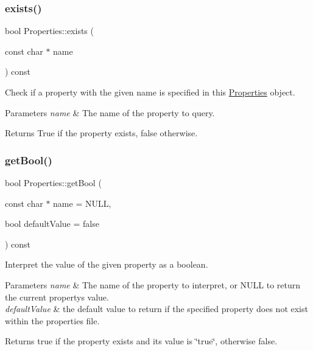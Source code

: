 \subsubsection{\texorpdfstring{exists()}{exists()}\hspace{0.1cm}{\footnotesize\ttfamily [2/2]}}
{\footnotesize\ttfamily bool Properties\+::exists (\begin{DoxyParamCaption}\item[{const char $\ast$}]{name }\end{DoxyParamCaption}) const}

Check if a property with the given name is specified in this \hyperlink{classProperties}{Properties} object.


\begin{DoxyParams}{Parameters}
{\em name} & The name of the property to query.\\
\hline
\end{DoxyParams}
\begin{DoxyReturn}{Returns}
True if the property exists, false otherwise. 
\end{DoxyReturn}
\mbox{\label{classProperties_a71277d94b2486dd4f6f8ca5bde7cfcc8}} 
\subsubsection{\texorpdfstring{get\+Bool()}{getBool()}\hspace{0.1cm}{\footnotesize\ttfamily [1/2]}}
{\footnotesize\ttfamily bool Properties\+::get\+Bool (\begin{DoxyParamCaption}\item[{const char $\ast$}]{name = {\ttfamily NULL},  }\item[{bool}]{default\+Value = {\ttfamily false} }\end{DoxyParamCaption}) const}

Interpret the value of the given property as a boolean.


\begin{DoxyParams}{Parameters}
{\em name} & The name of the property to interpret, or N\+U\+LL to return the current property\textquotesingle{}s value. \\
\hline
{\em default\+Value} & the default value to return if the specified property does not exist within the properties file.\\
\hline
\end{DoxyParams}
\begin{DoxyReturn}{Returns}
true if the property exists and its value is \char`\"{}true\char`\"{}, otherwise false. 
\end{DoxyReturn}
\mbox{\label{classProperties_a71277d94b2486dd4f6f8ca5bde7cfcc8}} 
